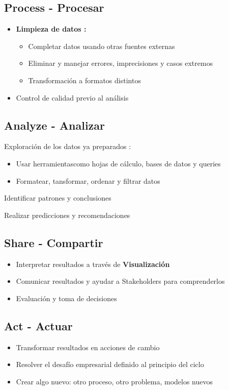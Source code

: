 \subsection{Process - Procesar}
\begin{itemize}
    \item {\textbf{Limpieza de datos : }
    \begin{itemize}
        \item {Completar datos usando otras fuentes externas}
        \item {Eliminar y manejar errores, imprecisiones y casos extremos}
        \item {Transformación a formatos distintos}
    \end{itemize}}
    \item {Control de calidad previo al análisis}
\end{itemize}

\subsection{Analyze - Analizar}
\begin{itemize}
    \item {Exploración de los datos ya preparados :
    \begin{itemize}
        \item {Usar herramientascomo hojas de cálculo, bases de datos y queries}
        \item {Formatear, tansformar, ordenar y filtrar datos}
    \end{itemize}
    \item {Identificar patrones y conclusiones}
    \item {Realizar predicciones y recomendaciones}}
\end{itemize}

\subsection{Share - Compartir}
\begin{itemize}
    \item {Interpretar resultados a través de \textbf{Visualización}}
    \item {Comunicar resultados y ayudar a Stakeholders para comprenderlos}
    \item {Evaluación y toma de decisiones}
\end{itemize}

\subsection{Act - Actuar}
\begin{itemize}
    \item {Transformar resultados en acciones de cambio}
    \item {Resolver el desafío empresarial definido al principio del ciclo}
    \item {Crear algo nuevo: otro proceso, otro problema, modelos nuevos}
\end{itemize}

\newpage